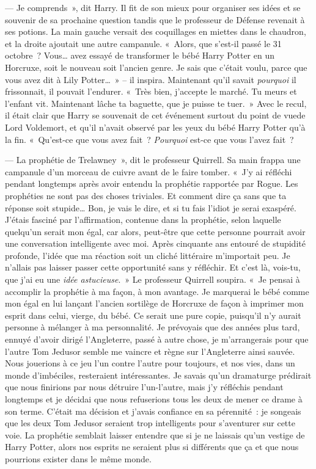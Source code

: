 --- Je comprends~», dit Harry.
Il fit de son mieux pour organiser ses idées et se souvenir de sa prochaine question tandis que le professeur de Défense revenait à ses potions.
La main gauche versait des coquillages en miettes dans le chaudron, et la droite ajoutait une autre campanule.
«~Alors, que s'est-il passé le 31 octobre~?
Vous… avez essayé de transformer le bébé Harry Potter en un Horcruxe, soit le nouveau soit l'ancien genre.
Je sais que c'était voulu, parce que vous avez dit à Lily Potter…~»
-- il inspira.
Maintenant qu'il savait \emph{pourquoi} il frissonnait, il pouvait l'endurer.
«~Très bien, j'accepte le marché.
Tu meurs et l'enfant vit.
Maintenant lâche ta baguette, que je puisse te tuer.~»
Avec le recul, il était clair que Harry se souvenait de cet événement surtout du point de vuede Lord Voldemort, et qu'il n'avait observé par les yeux du bébé Harry Potter qu'à la fin.
«~Qu'est-ce que vous avez fait~?
\emph{Pourquoi} est-ce que vous l'avez fait~?

--- La prophétie de Trelawney~», dit le professeur Quirrell.
Sa main frappa une campanule d'un morceau de cuivre avant de le faire tomber.
«~J'y ai réfléchi pendant longtemps après avoir entendu la prophétie rapportée par Rogue.
Les prophéties ne sont pas des choses triviales.
Et comment dire ça sans que ta réponse soit stupide…
Bon, je vais le dire, et si tu fais l'idiot je serai exaspéré.
J'étais fasciné par l'affirmation, contenue dans la prophétie, selon laquelle quelqu'un serait mon égal, car alors, peut-être que cette personne pourrait avoir une conversation intelligente avec moi.
Après cinquante ans entouré de stupidité profonde, l'idée que ma réaction soit un cliché littéraire m'importait peu.
Je n'allais pas laisser passer cette opportunité sans y réfléchir.
Et c'est là, vois-tu, que j'ai eu une \emph{idée astucieuse}.~»
Le professeur Quirrell soupira.
«~Je pensai à accomplir la prophétie à ma façon, à mon avantage.
Je marquerai le bébé comme mon égal en lui lançant l'ancien sortilège de Horcruxe de façon à imprimer mon esprit dans celui, vierge, du bébé.
Ce serait une pure copie, puisqu'il n'y aurait personne à mélanger à ma personnalité.
Je prévoyais que des années plus tard, ennuyé d'avoir dirigé l'Angleterre, passé à autre chose, je m'arrangerais pour que l'autre Tom Jedusor semble me vaincre et règne sur l'Angleterre ainsi sauvée.
Nous jouerions à ce jeu l'un contre l'autre pour toujours, et nos vies, dans un monde d'imbéciles, resteraient intéressantes.
Je savais qu'un dramaturge prédirait que nous finirions par nous détruire l'un-l'autre, mais j'y réfléchis pendant longtemps et je décidai que nous refuserions tous les deux de mener ce drame à son terme.
C'était ma décision et j'avais confiance en sa pérennité~: je songeais que les deux Tom Jedusor seraient trop intelligents pour s'aventurer sur cette voie.
La prophétie semblait laisser entendre que si je ne laissais qu'un vestige de Harry Potter, alors nos esprits ne seraient plus si différents que ça et que nous pourrions exister dans le même monde.

